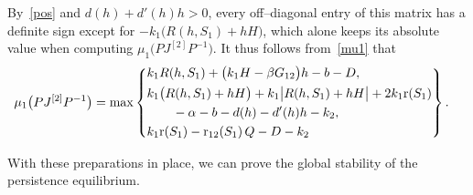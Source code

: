 \documentclass[reqno,11pt]{amsart}
\numberwithin{equation}{section}
\begin{document}
By~\eqref{pos} and $d(h)+d'(h)h>0$, every off--diagonal entry of this matrix has a definite sign except for
 $-k_1\big(R(h,S_1)+hH\big)$, which alone keeps its absolute value when computing $\mu_1\big(PJ^{[2]}P^{-1}\big)$.  It thus follows from~\eqref{mu1} that
\begin{equation}\label{colsum}
\begin{aligned}
\mu_1\big(PJ^{[2]}P^{-1}\big)
&=\max\left\{
\begin{aligned}
&k_1 R(h,S_1)+\big(k_1 H-\beta G_{12}\big)h-b-D,\\
&k_1\big(R(h,S_1)+hH\big)+k_1\big|R(h,S_1)+hH\big|+2k_1 {\rm r}(S_1)\\
&\qquad-\alpha-b-d(h)-d'(h)h-k_2,\\
&k_1 {\rm r}(S_1)-{\rm r}_{12}(S_1)\,Q-D-k_2
\end{aligned}
\right\}.
\end{aligned}
\end{equation}

With these preparations in place, we can prove the global stability of the persistence equilibrium.
\end{document}
